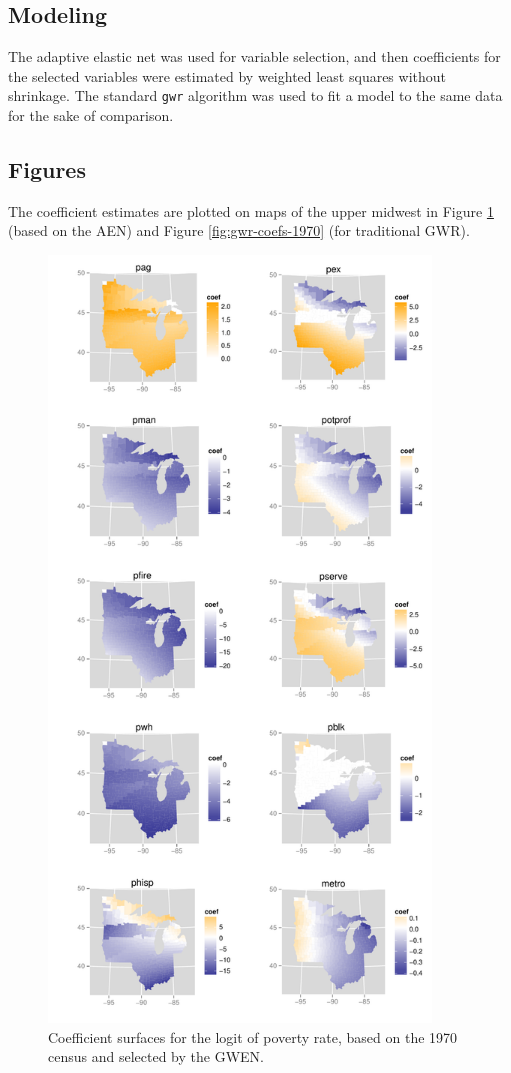 \documentclass[authoryear, review, 11pt]{elsarticle}
\begin{document}
	\subsection{Modeling}	
	The adaptive elastic net was used for variable selection, and then coefficients for the selected variables were estimated by weighted least squares without shrinkage. The standard {\tt gwr} algorithm was used to fit a model to the same data for the sake of comparison.
	
	\subsection{Figures}
	The coefficient estimates are plotted on maps of the upper midwest in Figure \ref{fig:unshrunk-enet-coefs-1970} (based on the AEN) and Figure \ref{fig:gwr-coefs-1970} (for traditional GWR).
	\begin{figure}
		\begin{center}
			\includegraphics[height=8in]{../../figures/poverty/1970-enet-linear-coefficients-unshrunk.pdf}
			\caption{Coefficient surfaces for the logit of poverty rate, based on the 1970 census and selected by the GWEN. \label{fig:unshrunk-enet-coefs-1970}}
		\end{center}
	\end{figure}	
		
\end{document}
